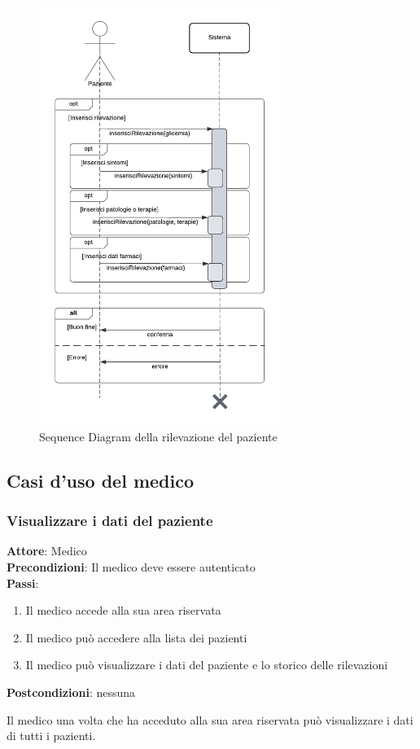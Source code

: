 \documentclass[a4paper]{article}
\begin{document}
\begin{figure}[H]
  \centering
  \includegraphics[width=0.7\textwidth]{sdPaziente}
  \caption{Sequence Diagram della rilevazione del paziente}
  \label{fig:sdPaziente}
\end{figure}

\subsection{Casi d'uso del medico}

\subsubsection{Visualizzare i dati del paziente}

\begin{mdframed}
  \textbf{Attore}: Medico\\
  \textbf{Precondizioni}: Il medico deve essere autenticato\\
  \textbf{Passi}: 
  \begin{enumerate}[nosep]
    \item Il medico accede alla sua area riservata
    \item Il medico può accedere alla lista dei pazienti
    \item Il medico può visualizzare i dati del paziente e lo storico delle rilevazioni
  \end{enumerate}
  \textbf{Postcondizioni}: nessuna
\end{mdframed}
\noindent
Il medico una volta che ha acceduto alla sua area riservata può visualizzare i dati di tutti i pazienti. 
\end{document}

